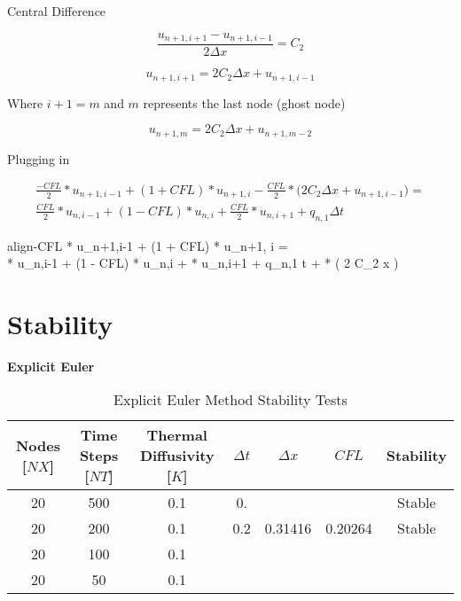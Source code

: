 \documentclass[10pt, letter, showtrims]{extarticle}
\newcommand{\boxedeq}[2]{\begin{empheq}[box={\fboxsep=6pt\fbox}]{align}\label{#1}#2\end{empheq}}
\begin{document}
    		\noindent
    		Central Difference
    		
    		\begin{equation}
    			\frac{u_{n+1,i+1} - u_{n+1,i-1}}{2 \Delta x} = C_{2}
    		\end{equation}
    		
    		\begin{equation}
    			u_{n+1,i+1} = 2 C_{2} \Delta x + u_{n+1,i-1}
    		\end{equation}
    		
    		\noindent
    		Where $i+1 = m$ and $m$ represents the last node (ghost node)
    		
    		\begin{equation}
    			u_{n+1,m} = 2 C_{2} \Delta x + u_{n+1,m-2}
    		\end{equation}
    		
    		\noindent
    		Plugging in
    		
    		\begin{equation}
    			\begin{split}
    			\frac{-CFL}{2} * u_{n+1,i-1} + (1 + CFL) * u_{n+1, i} - \frac{CFL}{2} * \big( 2 C_{2} \Delta x + u_{n+1,i-1} \big) = \\ 
    			\frac{CFL}{2} * u_{n,i-1} + (1 - CFL) * u_{n,i} + \frac{CFL}{2} * u_{n,i+1} + q_{n,1} \Delta t
    			\end{split}
    		\end{equation}
    		
    		\boxedeq{}{-CFL * u_{n+1,i-1} + (1 + CFL) * u_{n+1, i} = \\ 
    			\frac{CFL}{2} * u_{n,i-1} + (1 - CFL) * u_{n,i} + \frac{CFL}{2} * u_{n,i+1} + q_{n,1} \Delta t + \frac{CFL}{2} * \big( 2 C_{2} \Delta x \big)}
    		
		\pagebreak
		
		\section{Stability}
		
		\textbf{Explicit Euler}
		
		\begin{table}[h]
			\caption{Explicit Euler Method Stability Tests}
			\centering
			\begin{tabular}{|c|c|c|c|c|c|c|}
				\hline
				Nodes [$NX$] & Time Steps [$NT$] & Thermal Diffusivity [$K$] & $\Delta t$ & $\Delta x$ & $CFL$ & Stability \\
				\hline \rowcolor{Gray} 
				20 & 500 & 0.1 & 0.  &         &         & Stable \\
				\hline
				20 & 200 & 0.1 & 0.2 & 0.31416 & 0.20264 & Stable \\
				\hline \rowcolor{Gray} 
				20 & 100 & 0.1 &     &         &         &        \\
				\hline
				20 & 50  & 0.1 &     &         &         &        \\
				\hline
			\end{tabular}
		\end{table}
		
\end{document}
